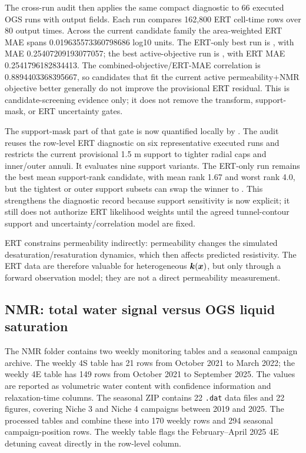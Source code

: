 The cross-run audit  then applies
the same compact diagnostic to 66 executed OGS runs with output fields.  Each run
compares 162,800 ERT cell-time rows over 80 output times.  Across the current
candidate family the area-weighted ERT MAE spans 0.019635573360798686 log10 units.
The ERT-only best run is
, with MAE
0.25407209193077057; the best active-objective run is
, with ERT MAE
0.2541796182834413.  The combined-objective/ERT-MAE correlation is
0.8894403368395667, so candidates that fit the current active permeability+NMR
objective better generally do not improve the provisional ERT residual.  This is
candidate-screening evidence only; it does not remove the transform, support-mask, or
ERT uncertainty gates.

The support-mask part of that gate is now quantified locally by
.  The audit reuses the row-level ERT
diagnostic on six representative executed runs and restricts the current provisional
1.5 m support to tighter radial caps and inner/outer annuli.  It evaluates nine
support variants.  The ERT-only run
 remains the best mean
support-rank candidate, with mean rank 1.67 and worst rank 4.0, but the tightest or
outer support subsets can swap the winner to
.  This strengthens the
diagnostic record because support sensitivity is now explicit; it still does not
authorize ERT likelihood weights until the agreed tunnel-contour support and
uncertainty/correlation model are fixed.

ERT constrains permeability indirectly: permeability changes the simulated
desaturation/resaturation dynamics, which then affects predicted resistivity.  The
ERT data are therefore valuable for heterogeneous \(\bm{k}(\bm x)\), but only through a
forward observation model; they are not a direct permeability measurement.

\subsection{NMR: total water signal versus OGS liquid saturation}

The NMR folder contains two weekly monitoring tables and a seasonal campaign archive.
The weekly 4S table has 21 rows from October 2021 to March 2022; the weekly 4E table
has 149 rows from October 2021 to September 2025.  The values are reported as
volumetric water content with confidence information and relaxation-time columns.  The
seasonal ZIP contains 22 \texttt{.dat} data files and 22 figures, covering Niche 3 and
Niche 4 campaigns between 2019 and 2025.  The processed tables
 and  combine these into 170
weekly rows and 294 seasonal campaign-position rows.  The weekly table flags the
February--April 2025 4E detuning caveat directly in the row-level 
column.

